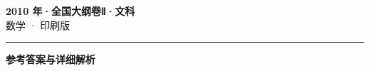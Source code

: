 \documentclass[zihao=5, a4paper]{ctexart}
\begin{document}
\begin{center}
  {\Large\bfseries 2010 年·全国大纲卷Ⅱ·文科}\\[4pt]
  {\large 数学 · 印刷版}
\end{center}
\medskip
{}

\par\bigskip\hrule\bigskip
{}
\begin{center}{\large\bfseries 参考答案与详细解析}\end{center}
\smallskip

\end{document}
